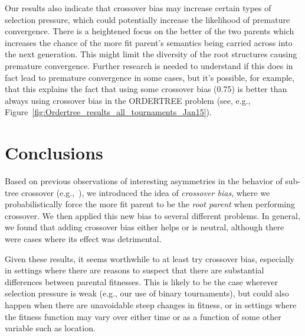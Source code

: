 \documentclass{sig-alternate}
\begin{document}
Our results also indicate that crossover bias may increase certain types of selection pressure, which could potentially
increase the likelihood of premature convergence.
There is a heightened focus on the better of the two parents which increases the chance of the more fit parent's
semantics being carried across into the next generation. This might limit the diversity of the root structures causing
premature convergence. Further research is needed to understand if this does in fact lead to premature convergence in
some cases, but it's possible, for example, that this explains the fact that using some crossover bias (0.75) is better
than always using crossover bias in the ORDERTREE problem (see, e.g.,
Figure~\ref{fig:Ordertree_results_all_tournaments_Jan15}).


\pagebreak 

\section{Conclusions} \label{sec:Conclusions}

Based on previous observations of interesting asymmetries in the behavior of sub-tree crossover
(e.g.,~\cite{McPheeDonatucciDramdahl:2014}), we introduced the idea of \emph{crossover bias}, where we
probabilistically force the more fit parent to be the \emph{root parent} when performing crossover. We then applied
this new bias to several different problems. In general, we found that adding crossover bias either
helps or is neutral, although there were cases where its effect was detrimental.

Given these results, it seems worthwhile to at least try crossover bias, especially in settings where there are reasons
to suspect that there are substantial differences between parental fitnesses. This is likely to be the case wherever
selection pressure is weak (e.g., our use of binary tournaments), but could also happen when there are unavoidable
steep changes in fitness, or in settings where the fitness function may vary over either time or as a function of some
other variable such as location.
\end{document}
